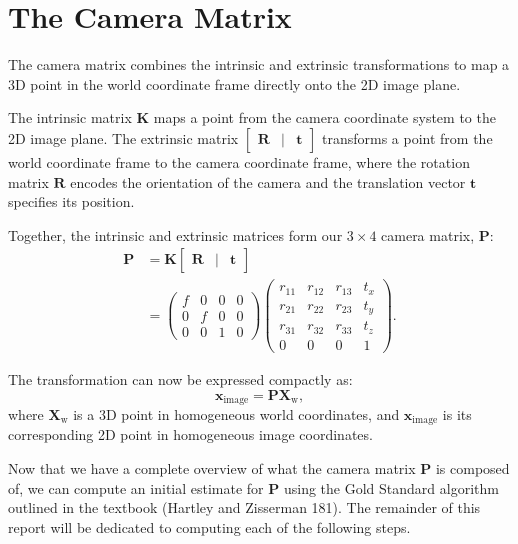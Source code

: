 \documentclass[12pt]{article}
\begin{document}
\section{The Camera Matrix}

The camera matrix combines the intrinsic and extrinsic transformations to map a 3D point in the world coordinate frame directly onto the 2D image plane.

The intrinsic matrix $\mathbf{K}$ maps a point from the camera coordinate system to the 2D image plane. The extrinsic matrix $\begin{bmatrix} \mathbf{R} & | & \mathbf{t} \end{bmatrix}$ transforms a point from the world coordinate frame to the camera coordinate frame, where the rotation matrix $\mathbf{R}$ encodes the orientation of the camera and the translation vector $\mathbf{t}$ specifies its position.

Together, the intrinsic and extrinsic matrices form our $3\times 4$ camera matrix, $\mathbf{P}$:
\begin{align*}
    \mathbf{P} &= \mathbf{K} \begin{bmatrix} \mathbf{R} & | & \mathbf{t} \end{bmatrix} \\
    &= \begin{pmatrix}
        f & 0 & 0 & 0 \\
        0 & f & 0 & 0 \\
        0 & 0 & 1 & 0
    \end{pmatrix}
    \begin{pmatrix}
        r_{11} & r_{12} & r_{13} & t_x \\
        r_{21} & r_{22} & r_{23} & t_y \\
        r_{31} & r_{32} & r_{33} & t_z \\
        0 & 0 & 0 & 1
    \end{pmatrix}.
\end{align*}

The transformation can now be expressed compactly as:
$$
\mathbf{x}_{\text{image}} = \mathbf{P} \mathbf{X}_{\text{w}},
$$
where $\mathbf{X}_{\text{w}}$ is a 3D point in homogeneous world coordinates, and $\mathbf{x}_{\text{image}}$ is its corresponding 2D point in homogeneous image coordinates.

Now that we have a complete overview of what the camera matrix $ \mathbf{P} $ is composed of, we can compute an initial estimate for $ \mathbf{P} $ using the Gold Standard algorithm outlined in the textbook (Hartley and Zisserman 181). The remainder of this report will be dedicated to computing each of the following steps.
\end{document}
